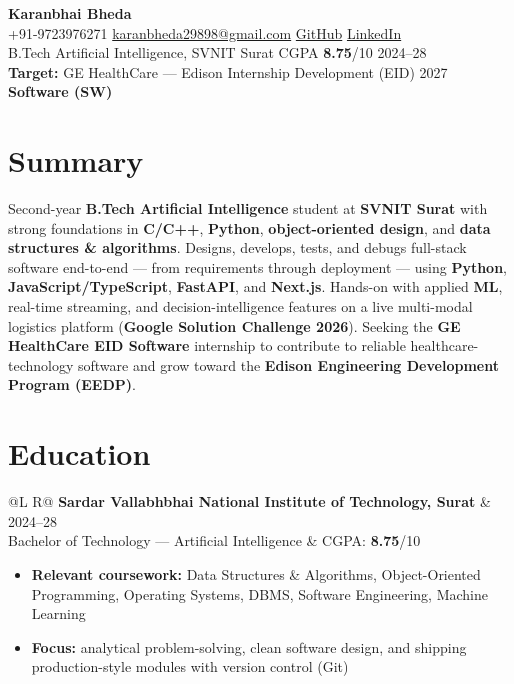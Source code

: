 \documentclass[a4paper,10pt]{article}
\makeatletter
\newcommand{\entry}[4]{%
  \vspace{0.5mm}
  \noindent\begin{tabularx}{\textwidth}{@{}L R@{}}
    \textbf{#1} & {\small #2} \\
    {\small #3} & {\small #4} \\
  \end{tabularx}\par
}
\makeatother
\begin{document}
\selectfont

\begin{center}
  {\LARGE \textbf{Karanbhai Bheda}} \\[1.1mm]
  \small
  +91-9723976271 \textbar{}
  \href{mailto:karanbheda29898@gmail.com}{karanbheda29898@gmail.com} \textbar{}
  \href{https://github.com/KARANBHAI029}{GitHub} \textbar{}
  \href{https://www.linkedin.com/in/karan-bheda-2a7483335/}{LinkedIn} \\[0.35mm]
  B.Tech Artificial Intelligence, SVNIT Surat \textbar{} CGPA \textbf{8.75}/10 \textbar{} 2024--28 \\[0.25mm]
  \textbf{Target:} GE HealthCare --- Edison Internship Development (EID) 2027 \textbar{} \textbf{Software (SW)}
\end{center}

\section{Summary}
\noindent\small
Second-year \textbf{B.Tech Artificial Intelligence} student at \textbf{SVNIT Surat} with strong foundations in \textbf{C/C++}, \textbf{Python}, \textbf{object-oriented design}, and \textbf{data structures \& algorithms}.
Designs, develops, tests, and debugs full-stack software end-to-end --- from requirements through deployment --- using \textbf{Python}, \textbf{JavaScript/TypeScript}, \textbf{FastAPI}, and \textbf{Next.js}.
Hands-on with applied \textbf{ML}, real-time streaming, and decision-intelligence features on a live multi-modal logistics platform (\textbf{Google Solution Challenge 2026}).
Seeking the \textbf{GE HealthCare EID Software} internship to contribute to reliable healthcare-technology software and grow toward the \textbf{Edison Engineering Development Program (EEDP)}.

\section{Education}
\entry{Sardar Vallabhbhai National Institute of Technology, Surat}{2024--28}
{Bachelor of Technology --- Artificial Intelligence}{CGPA: \textbf{8.75}/10}
\begin{itemize}
  \item \textbf{Relevant coursework:} Data Structures \& Algorithms, Object-Oriented Programming, Operating Systems, DBMS, Software Engineering, Machine Learning
  \item \textbf{Focus:} analytical problem-solving, clean software design, and shipping production-style modules with version control (Git)
\end{itemize}
\end{document}
